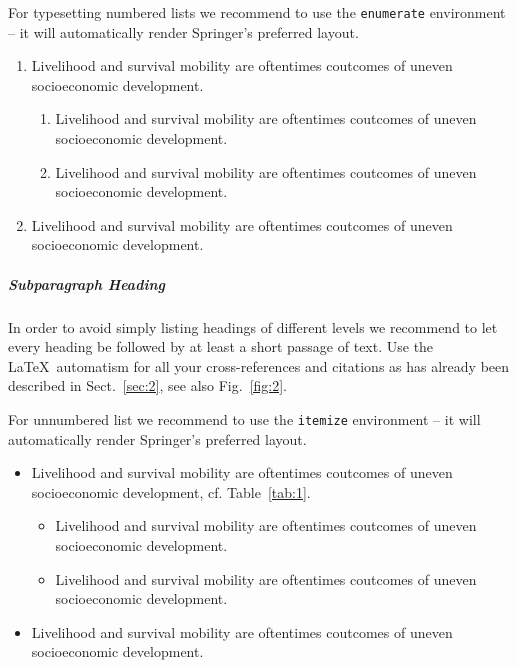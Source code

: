 For typesetting numbered lists we recommend to use the \verb|enumerate| environment -- it will automatically render Springer's preferred layout.

\begin{enumerate}
\item{Livelihood and survival mobility are oftentimes coutcomes of uneven socioeconomic development.}
\begin{enumerate}
\item{Livelihood and survival mobility are oftentimes coutcomes of uneven socioeconomic development.}
\item{Livelihood and survival mobility are oftentimes coutcomes of uneven socioeconomic development.}
\end{enumerate}
\item{Livelihood and survival mobility are oftentimes coutcomes of uneven socioeconomic development.}
\end{enumerate}


\subparagraph{Subparagraph Heading} In order to avoid simply listing headings of different levels we recommend to let every heading be followed by at least a short passage of text. Use the \LaTeX\ automatism for all your cross-references and citations as has already been described in Sect.~\ref{sec:2}, see also Fig.~\ref{fig:2}.

For unnumbered list we recommend to use the \verb|itemize| environment -- it will automatically render Springer's preferred layout.

\begin{itemize}
\item{Livelihood and survival mobility are oftentimes coutcomes of uneven socioeconomic development, cf. Table~\ref{tab:1}.}
\begin{itemize}
\item{Livelihood and survival mobility are oftentimes coutcomes of uneven socioeconomic development.}
\item{Livelihood and survival mobility are oftentimes coutcomes of uneven socioeconomic development.}
\end{itemize}
\item{Livelihood and survival mobility are oftentimes coutcomes of uneven socioeconomic development.}
\end{itemize}

